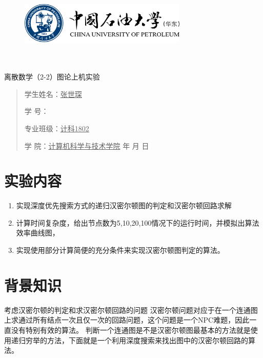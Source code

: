 \documentclass{article}
\renewcommand{\today}{\number\year 年 \number\month 月 \number\day 日}
\begin{document}
\begin{figure}
    \centering
    \includegraphics[width=8cm]{upc.png}

    \label{figupc}
\end{figure}

	\begin{center}
		\quad \\
		\quad \\
		\heiti \fontsize{45}{17} \quad \quad \quad 
		\vskip 1.5cm
		\heiti {} 离散数学（2-2）图论上机实验
	\end{center}
	\vskip 3.0cm
		
	\begin{quotation}
		\doublespacing
		
        \par\setlength\parindent{7em}
		\quad 

		学生姓名：\underline{\qquad  张世琛 \qquad \qquad}

		学\hspace{0.61cm} 号：\underline{\qquad}
		
		专业班级：\underline{\qquad 计科1802 \qquad  }
		
        学\hspace{0.61cm} 院：\underline{计算机科学与技术学院}
		\vskip 5cm
		\centering
		\today
    \end{quotation}
\thispagestyle{empty}
\newpage
\setcounter{page}{1}
\section{实验内容}
\begin{enumerate}
    \item 实现深度优先搜索方式的递归汉密尔顿图的判定和汉密尔顿回路求解
    \item 计算时间复杂度，给出节点数为5,10,20,100情况下的运行时间，并模拟出算法效率曲线图，
    \item 实现使用部分计算简便的充分条件来实现汉密尔顿图判定的算法。    
\end{enumerate}
\section{背景知识}
考虑汉密尔顿的判定和求汉密尔顿回路的问题
汉密尔顿问题对应于在一个连通图上求通过所有结点一次且仅一次的回路问题，这个问题是一个NPC难题，因此一直没有特别有效的算法。
判断一个连通图是不是汉密尔顿图最基本的方法就是使用递归穷举的方法，下面就是一个利用深度搜索来找出图中的汉密尔顿回路的算法。
\end{document}

